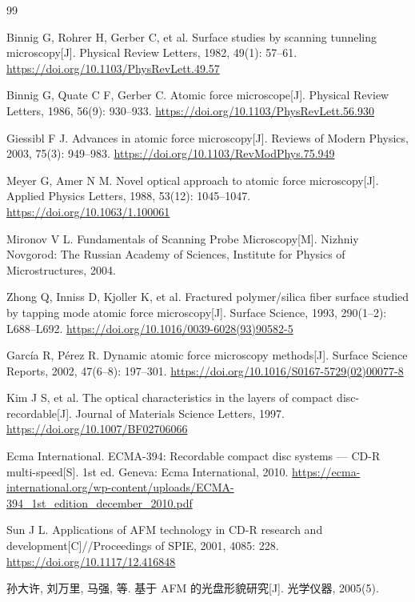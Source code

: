 \begin{thebibliography}{99}

Binnig G, Rohrer H, Gerber C, et al. Surface studies by scanning tunneling microscopy[J]. Physical Review Letters, 1982, 49(1): 57--61.
\url{https://doi.org/10.1103/PhysRevLett.49.57}

Binnig G, Quate C F, Gerber C. Atomic force microscope[J]. Physical Review Letters, 1986, 56(9): 930--933.
\url{https://doi.org/10.1103/PhysRevLett.56.930}

Giessibl F J. Advances in atomic force microscopy[J]. Reviews of Modern Physics, 2003, 75(3): 949--983.
\url{https://doi.org/10.1103/RevModPhys.75.949}

Meyer G, Amer N M. Novel optical approach to atomic force microscopy[J]. Applied Physics Letters, 1988, 53(12): 1045--1047.
\url{https://doi.org/10.1063/1.100061}

Mironov V L. Fundamentals of Scanning Probe Microscopy[M]. Nizhniy Novgorod: The Russian Academy of Sciences, Institute for Physics of Microstructures, 2004.

Zhong Q, Inniss D, Kjoller K, et al. Fractured polymer/silica fiber surface studied by tapping mode atomic force microscopy[J]. Surface Science, 1993, 290(1--2): L688--L692.
\url{https://doi.org/10.1016/0039-6028(93)90582-5}

García R, Pérez R. Dynamic atomic force microscopy methods[J]. Surface Science Reports, 2002, 47(6--8): 197--301.
\url{https://doi.org/10.1016/S0167-5729(02)00077-8}

Kim J S, et al. The optical characteristics in the layers of compact disc-recordable[J]. Journal of Materials Science Letters, 1997.
\url{https://doi.org/10.1007/BF02706066}

Ecma International. ECMA-394: Recordable compact disc systems --- CD-R multi-speed[S]. 1st ed. Geneva: Ecma International, 2010.
\url{https://ecma-international.org/wp-content/uploads/ECMA-394_1st_edition_december_2010.pdf}

Sun J L. Applications of AFM technology in CD-R research and development[C]//Proceedings of SPIE, 2001, 4085: 228.
\url{https://doi.org/10.1117/12.416848}

孙大许, 刘万里, 马强, 等. 基于 AFM 的光盘形貌研究[J]. 光学仪器, 2005(5).


\end{thebibliography}
